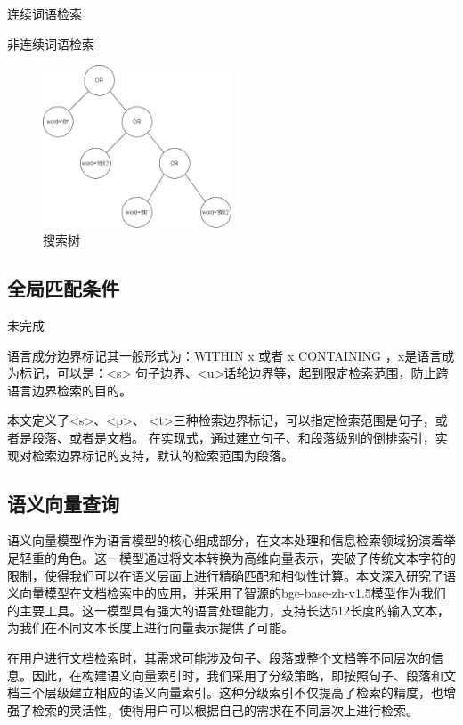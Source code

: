 \documentclass[11pt]{article}
\begin{document}
\begin{CJK*}{UTF8}{gbsn}
连续词语检索

非连续词语检索

\begin{figure}[h]
	\centering
	\includegraphics[width=0.5\textwidth]{node-tree.jpg}
	\caption{搜索树}
	\label{fig:example}
\end{figure}

\subsection{全局匹配条件}

未完成

语言成分边界标记其一般形式为：WITHIN x 或者 x CONTAINING ，x是语言成为标记，可以是：<s> 句子边界、<u>话轮边界等，起到限定检索范围，防止跨语言边界检索的目的。

本文定义了<s>、<p>、 <t>三种检索边界标记，可以指定检索范围是句子，或者是段落、或者是文档。
在实现式，通过建立句子、和段落级别的倒排索引，实现对检索边界标记的支持，默认的检索范围为段落。


\subsection{语义向量查询}

语义向量模型作为语言模型的核心组成部分，在文本处理和信息检索领域扮演着举足轻重的角色。这一模型通过将文本转换为高维向量表示，突破了传统文本字符的限制，使得我们可以在语义层面上进行精确匹配和相似性计算。本文深入研究了语义向量模型在文档检索中的应用，并采用了智源的bge-base-zh-v1.5模型作为我们的主要工具。这一模型具有强大的语言处理能力，支持长达512长度的输入文本，为我们在不同文本长度上进行向量表示提供了可能。

在用户进行文档检索时，其需求可能涉及句子、段落或整个文档等不同层次的信息。因此，在构建语义向量索引时，我们采用了分级策略，即按照句子、段落和文档三个层级建立相应的语义向量索引。这种分级索引不仅提高了检索的精度，也增强了检索的灵活性，使得用户可以根据自己的需求在不同层次上进行检索。


\end{CJK*}
\end{document}
